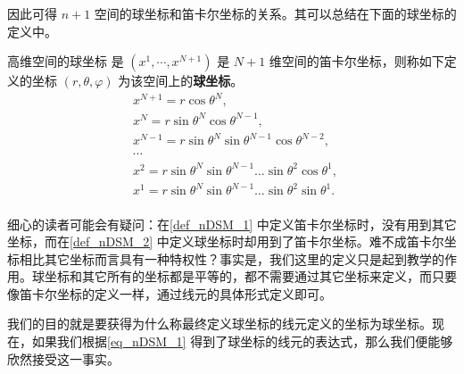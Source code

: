 因此可得 $n+1$ 空间的球坐标和笛卡尔坐标的关系。其可以总结在下面的球坐标的定义中。
\begin{definition}{高维空间的球坐标}\label{def_nDSM_2}
是 $(x^1,\cdots,x^{N+1})$ 是 $N+1$ 维空间的笛卡尔坐标，则称如下定义的坐标 $(r,\theta,\varphi)$ 为该空间上的\textbf{球坐标}。
\begin{equation}\label{eq_nDSM_1}
\begin{aligned}
&x^{N+1}=r\cos \theta^N,\\
&x^{N}=r\sin \theta^N\cos\theta^{N-1},\\
&x^{N-1}=r\sin \theta^N\sin\theta^{N-1}\cos\theta^{N-2},\\
&\cdots\\
&x^{2}=r\sin \theta^N\sin\theta^{N-1}\ldots\sin\theta^2\cos\theta^1,\\
&x^{1}=r\sin \theta^N\sin\theta^{N-1}\ldots\sin\theta^2\sin\theta^1.\\
\end{aligned}~
\end{equation}
\end{definition}

细心的读者可能会有疑问：在\autoref{def_nDSM_1} 中定义笛卡尔坐标时，没有用到其它坐标，而在\autoref{def_nDSM_2} 中定义球坐标时却用到了笛卡尔坐标。难不成笛卡尔坐标相比其它坐标而言具有一种特权性？事实是，我们这里的定义只是起到教学的作用。球坐标和其它所有的坐标都是平等的，都不需要通过其它坐标来定义，而只要像笛卡尔坐标的定义一样，通过线元的具体形式定义即可。

我们的目的就是要获得为什么称最终定义球坐标的线元定义的坐标为球坐标。现在，如果我们根据\autoref{eq_nDSM_1} 得到了球坐标的线元的表达式，那么我们便能够欣然接受这一事实。

